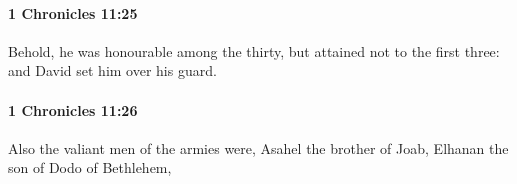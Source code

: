 		\paragraph{1 Chronicles 11:25} %
			\label{1CHRONICLES-11-25}

			Behold, he was honourable among the thirty, but attained not to the first three: and David set him over his guard.


		\paragraph{1 Chronicles 11:26} %
			\label{1CHRONICLES-11-26}

			Also the valiant men of the armies were, Asahel the brother of Joab, Elhanan the son of Dodo of Bethlehem,


